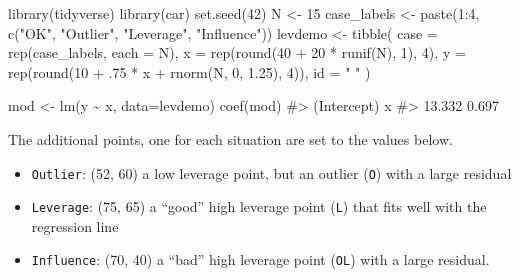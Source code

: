 \documentclass[
  letterpaper,
  10pt,
  krantz2]{krantz}
\makeatletter
\newenvironment{Shaded}{\begin{snugshade}}{\end{snugshade}}
\newcommand{\AttributeTok}[1]{\textcolor[rgb]{0.40,0.45,0.13}{#1}}
\newcommand{\CommentTok}[1]{\textcolor[rgb]{0.37,0.37,0.37}{#1}}
\newcommand{\DecValTok}[1]{\textcolor[rgb]{0.68,0.00,0.00}{#1}}
\newcommand{\FloatTok}[1]{\textcolor[rgb]{0.68,0.00,0.00}{#1}}
\newcommand{\FunctionTok}[1]{\textcolor[rgb]{0.28,0.35,0.67}{#1}}
\newcommand{\NormalTok}[1]{\textcolor[rgb]{0.00,0.23,0.31}{#1}}
\newcommand{\OtherTok}[1]{\textcolor[rgb]{0.00,0.23,0.31}{#1}}
\newcommand{\SpecialCharTok}[1]{\textcolor[rgb]{0.37,0.37,0.37}{#1}}
\newcommand{\StringTok}[1]{\textcolor[rgb]{0.13,0.47,0.30}{#1}}
\providecommand{\tightlist}{%
  \setlength{\itemsep}{0pt}\setlength{\parskip}{0pt}}\usepackage{longtable,booktabs,array}
\newenvironment{kframe}{%
  \medskip{}
  \setlength{\fboxsep}{.8em}
  \def\at@end@of@kframe{}%
  \ifinner\ifhmode%
  \def\at@end@of@kframe{\end{minipage}}%
  \begin{minipage}{\columnwidth}%
  \fi\fi%
  \def\FrameCommand##1{\hskip\@totalleftmargin \hskip-\fboxsep
  \colorbox{shadecolor}{##1}\hskip-\fboxsep
      \hskip-\linewidth \hskip-\@totalleftmargin \hskip\columnwidth}%
  \MakeFramed {\advance\hsize-\width
    \@totalleftmargin\z@ \linewidth\hsize
    \@setminipage}}%
{\par\unskip\endMakeFramed%
  \at@end@of@kframe}
\renewenvironment{Shaded}{\begin{kframe}}{\end{kframe}}
\makeatother
\begin{document}
\begin{Shaded}
\begin{Highlighting}[]
\FunctionTok{library}\NormalTok{(tidyverse)}
\FunctionTok{library}\NormalTok{(car)}
\FunctionTok{set.seed}\NormalTok{(}\DecValTok{42}\NormalTok{)}
\NormalTok{N }\OtherTok{\textless{}{-}} \DecValTok{15}
\NormalTok{case\_labels }\OtherTok{\textless{}{-}} \FunctionTok{paste}\NormalTok{(}\DecValTok{1}\SpecialCharTok{:}\DecValTok{4}\NormalTok{, }\FunctionTok{c}\NormalTok{(}\StringTok{"OK"}\NormalTok{, }\StringTok{"Outlier"}\NormalTok{, }\StringTok{"Leverage"}\NormalTok{, }\StringTok{"Influence"}\NormalTok{))}
\NormalTok{levdemo }\OtherTok{\textless{}{-}} \FunctionTok{tibble}\NormalTok{(}
    \AttributeTok{case =} \FunctionTok{rep}\NormalTok{(case\_labels, }
               \AttributeTok{each =}\NormalTok{ N),}
    \AttributeTok{x =} \FunctionTok{rep}\NormalTok{(}\FunctionTok{round}\NormalTok{(}\DecValTok{40} \SpecialCharTok{+} \DecValTok{20} \SpecialCharTok{*} \FunctionTok{runif}\NormalTok{(N), }\DecValTok{1}\NormalTok{), }\DecValTok{4}\NormalTok{),}
    \AttributeTok{y =} \FunctionTok{rep}\NormalTok{(}\FunctionTok{round}\NormalTok{(}\DecValTok{10} \SpecialCharTok{+}\NormalTok{ .}\DecValTok{75} \SpecialCharTok{*}\NormalTok{ x }\SpecialCharTok{+} \FunctionTok{rnorm}\NormalTok{(N, }\DecValTok{0}\NormalTok{, }\FloatTok{1.25}\NormalTok{), }\DecValTok{4}\NormalTok{)),}
    \AttributeTok{id =} \StringTok{" "}
\NormalTok{)}

\NormalTok{mod }\OtherTok{\textless{}{-}} \FunctionTok{lm}\NormalTok{(y }\SpecialCharTok{\textasciitilde{}}\NormalTok{ x, }\AttributeTok{data=}\NormalTok{levdemo)}
\FunctionTok{coef}\NormalTok{(mod)}
\CommentTok{\#\textgreater{} (Intercept)           x }
\CommentTok{\#\textgreater{}      13.332       0.697}
\end{Highlighting}
\end{Shaded}

The additional points, one for each situation are set to the values
below.

\begin{itemize}
\tightlist
\item
  \texttt{Outlier}: (52, 60) a low leverage point, but an outlier
  (\texttt{O}) with a large residual
\item
  \texttt{Leverage}: (75, 65) a ``good'' high leverage point
  (\texttt{L}) that fits well with the regression line
\item
  \texttt{Influence}: (70, 40) a ``bad'' high leverage point
  (\texttt{OL}) with a large residual.
\end{itemize}
\end{document}
